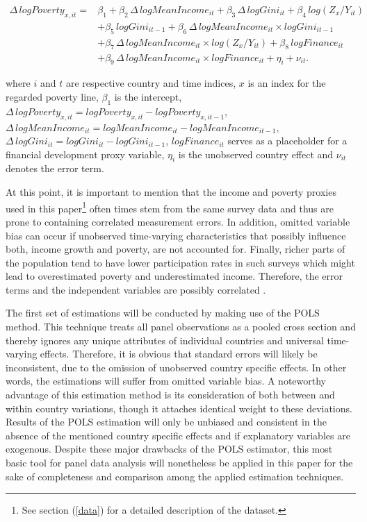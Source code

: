 \documentclass[12pt, a4paper]{article}
\begin{document}
\begin{equation} \label{eq:6}
\begin{split}
\Delta \, logPoverty_{x,it} ={} 	& \beta_{1} + \beta_{2} \, \Delta \, logMeanIncome_{it} + \beta_{3} \, \Delta \, logGini_{it} + \beta_{4} \, log(Z_{x}/Y_{it})  \\ &+ \beta_{5} \, logGini_{it-1} 
+ \beta_{6} \, \Delta \, logMeanIncome_{it}\times logGini_{it-1} \\ &+ \beta_{7} \, \Delta \, logMeanIncome_{it}\times log(Z_{x}/Y_{it}) + \beta_{8} \, logFinance_{it} \\ &+ \beta_{9} \, \Delta  \, logMeanIncome_{it}\times logFinance_{it} + \eta_{i} + \nu_{it}.
\end{split}
\end{equation}

where $i$ and $t$ are respective country and time indices, $x$ is an index for the regarded poverty line, $\beta_{1}$ is the intercept, $\Delta \, logPoverty_{x,it} = logPoverty_{x,it} - logPoverty_{x,it-1}$, $\Delta \, logMeanIncome_{it} = logMeanIncome_{it} - logMeanIncome_{it-1}$, $\Delta \, logGini_{it} = logGini_{it} - logGini_{it-1}$, $logFinance_{it}$ serves as a placeholder for a financial development proxy variable, $\eta_{i}$ is the unobserved country effect and $\nu_{it}$ denotes the error term.


At this point, it is important to mention that the income and poverty proxies used in this paper\footnote{See section (\ref{data}) for a detailed description of the dataset.} often times stem from the same survey data and thus are prone to containing correlated measurement errors. In addition, omitted variable bias can occur if unobserved time-varying characteristics that possibly influence both, income growth and poverty, are not accounted for. Finally, richer parts of the population tend to have lower participation rates in such surveys which might lead to overestimated poverty and underestimated income. Therefore, the error terms and the independent variables are possibly correlated \cite{kalwij2007}.

The first set of estimations will be conducted by making use of the POLS method. This technique treats all panel observations as a pooled cross section and thereby ignores any unique attributes of individual countries and universal time-varying effects. Therefore, it is obvious that standard errors will likely be inconsistent, due to the omission of unobserved country specific effects. In other words, the estimations will suffer from omitted variable bias. A noteworthy advantage of this estimation method is its consideration of both between and within country variations, though it attaches identical weight to these deviations. Results of the POLS estimation will only be unbiased and consistent in the absence of the mentioned country specific effects and if explanatory variables are exogenous. Despite these major drawbacks of the POLS estimator, this most basic tool for panel data analysis will nonetheless be applied in this paper for the sake of completeness and comparison among the applied estimation techniques.
\end{document}
